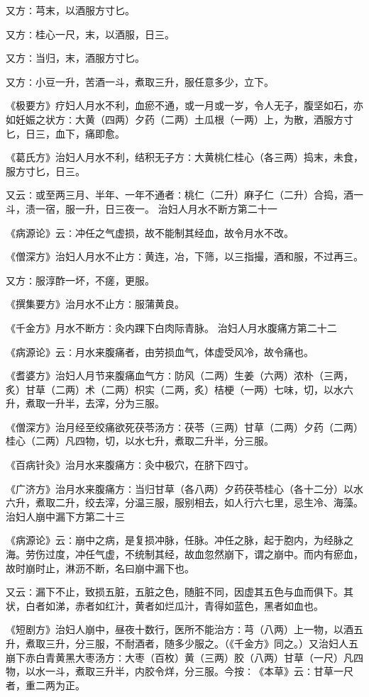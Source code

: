 \documentclass[a4paper,12pt,UTF8,twoside]{ctexbook}
\begin{document}
又方∶芎末，以酒服方寸匕。

又方∶桂心一尺，末，以酒服，日三。

又方∶当归，末，酒服方寸匕。

又方∶小豆一升，苦酒一斗，煮取三升，服任意多少，立下。

《极要方》疗妇人月水不利，血瘀不通，或一月或一岁，令人无子，腹坚如石，亦如妊娠之状方∶大黄（四两）夕药（二两）土瓜根（一两）上，为散，酒服方寸匕，日三，血下，痛即愈。

《葛氏方》治妇人月水不利，结积无子方∶大黄桃仁桂心（各三两）捣末，未食，服方寸匕，日三。

又云∶或至两三月、半年、一年不通者∶桃仁（二升）麻子仁（二升）合捣，酒一斗，渍一宿，服一升，日三夜一。
治妇人月水不断方第二十一

《病源论》云∶冲任之气虚损，故不能制其经血，故令月水不改。

《僧深方》治妇人月水不止方∶黄连，冶，下筛，以三指撮，酒和服，不过再三。

又方∶服淳酢一坏，不瘥，更服。

《撰集要方》治月水不止方∶服蒲黄良。

《千金方》月水不断方∶灸内踝下白肉际青脉。
治妇人月水腹痛方第二十二

《病源论》云∶月水来腹痛者，由劳损血气，体虚受风冷，故令痛也。

《耆婆方》治妇人月节来腹痛血气方∶防风（二两）生姜（六两）浓朴（三两，炙）甘草（二两）术（二两）枳实（二两，炙）桔梗（一两）七味，切，以水六升，煮取一升半，去滓，分为三服。

《僧深方》治月经至绞痛欲死茯苓汤方∶茯苓（三两）甘草（二两）夕药（二两）桂心（二两）凡四物，切，以水七升，煮取二升半，分三服。

《百病针灸》治月水来腹痛方∶灸中极穴，在脐下四寸。

《广济方》治月水来腹痛方∶当归甘草（各八两）夕药茯苓桂心（各十二分）以水六升，煮取二升，绞去滓，分温三服，服别相去，如人行六七里，忌生冷、海藻。
治妇人崩中漏下方第二十三

《病源论》云∶崩中之病，是复损冲脉，任脉。冲任之脉，起于胞内，为经脉之海。劳伤过度，冲任气虚，不统制其经，故血忽然崩下，谓之崩中。而内有瘀血，故时崩时止，淋沥不断，名曰崩中漏下也。

又云∶漏下不止，致损五脏，五脏之色，随脏不同，因虚其五色与血而俱下。其状，白者如涕，赤者如红汁，黄者如烂瓜汁，青得如蓝色，黑者如血也。

《短剧方》治妇人崩中，昼夜十数行，医所不能治方∶芎（八两）上一物，以酒五升，煮取三升，分三服，不耐酒者，随多少服之。（《千金方》同之。）又治妇人五崩下赤白青黄黑大枣汤方∶大枣（百枚）黄（三两）胶（八两）甘草（一尺）凡四物，以水一斗，煮取三升半，内胶令烊，分三服。今按∶《本草》云∶甘草一尺者，重二两为正。
\end{document}
